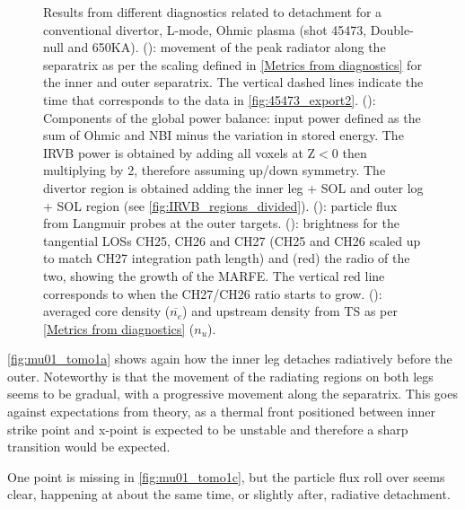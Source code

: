 \begin{figure}
     \vspace*{-3mm}
     \caption{Results from different diagnostics related to detachment for a conventional divertor, L-mode, Ohmic plasma (shot 45473, Double-null and 650KA). (): movement of the peak radiator along the separatrix as per the scaling defined in \autoref{Metrics from diagnostics} for the inner and outer separatrix. The vertical dashed lines indicate the time that corresponds to the data in \autoref{fig:45473_export2}. (): Components of the global power balance: input power defined as the sum of Ohmic and NBI minus the variation in stored energy. The IRVB power is obtained by adding all voxels at Z$<$0 then multiplying by 2, therefore assuming up/down symmetry. The divertor region is obtained adding the inner leg + SOL and outer log + SOL region (see \autoref{fig:IRVB_regions_divided}). (): particle flux from Langmuir probes at the outer targets. (): brightness for the tangential LOSs CH25, CH26 and CH27 (CH25 and CH26 scaled up to match CH27 integration path length) and (red) the radio of the two, showing the growth of the MARFE. The vertical red line corresponds to when the CH27/CH26 ratio starts to grow. (): averaged core density ($\overline{n_e}$) and upstream density from TS as per \autoref{Metrics from diagnostics} ($n_u$).}
	\label{fig:mu01_tomo1}
\end{figure}
\autoref{fig:mu01_tomo1a} shows again how the inner leg detaches radiatively before the outer. Noteworthy is that the movement of the radiating regions on both legs seems to be gradual, with a progressive movement along the separatrix. This goes against expectations from theory, as a thermal front positioned between inner strike point and x-point is expected to be unstable and therefore a sharp transition would be expected.\cite{Lipschultz2016}

One point is missing in \autoref{fig:mu01_tomo1c}, but the particle flux roll over seems clear, happening at about the same time, or slightly after, radiative detachment.

